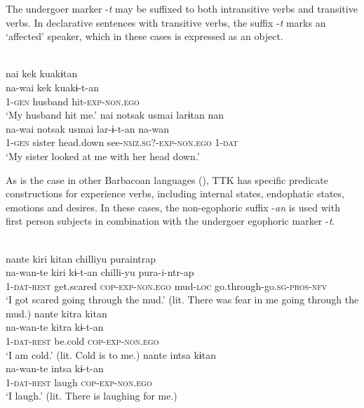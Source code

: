 \documentclass[output=paper]{langsci/langscibook}
\begin{document}
The undergoer marker -\textit{t} may be suffixed to both intransitive verbs and transitive verbs. In declarative sentences with transitive verbs, the suffix -\textit{t} marks an ‘affected’ speaker, which in these cases is expressed as an object.

\ea
{}\\ 
	\ea \label{ex:gg66a}
    \glll nai kek kuakɨtan\\
    na-wai	kek	kuakɨ-t-an\\
         1-\textsc{gen}	husband	hit-\textsc{exp-non.ego}\\
    \glt ‘‎‎My husband hit me.’
  \ex \label{ex:gg66b}
    \glll nai notsak usmai larɨtan nan\\
    na-wai	notsak	usmai	lar-ɨ-t-an	na-wan\\
         1-\textsc{gen}	sister	head.down	see-\textsc{nmz.sg?-exp-non.ego}	1-\textsc{dat}\\    
   	\glt ‘My sister looked at me with her head down.’
\z \z

As is the case in other Barbacoan languages (\citealt[25]{Floyd2018}), TTK has specific predicate constructions for experience verbs, including internal states, endophatic states, emotions and desires. In these cases, the non-egophoric suffix -\textit{an} is used with first person subjects in combination with the undergoer egophoric marker -\textit{t}.

\newpage
\ea
{}\\ 
	\ea \label{ex:gg67a}
    \glll nante	kiri kitan chilliyu	puraintrap\\
    na-wan-te kiri kɨ-t-an chilli-yu pura-i-ntr-ap\\
         1-\textsc{dat-rest} get.scared \textsc{cop-exp-non.ego} mud-\textsc{loc} go.through-go.\textsc{sg-pros-nfv}\\
    \glt ‘I got scared going through the mud.’ (lit. There was fear in me going through the mud.)
  	\ex \label{ex:gg67b}
    \glll nante kitra kitan\\
    na-wan-te kitra kɨ-t-an\\
        1-\textsc{dat-rest}	be.cold	\textsc{cop-exp-non.ego}\\    
   	\glt ‘I am cold.’ (lit. Cold is to me.)
  	\ex \label{ex:gg67c}
  	\glll nante	intsa kɨtan\\
  	na-wan-te intsa kɨ-t-an\\
  	1-\textsc{dat-rest} laugh \textsc{cop-exp-non.ego}\\
	\glt `I laugh.' (lit. There is laughing for me.) 
\z \z
\end{document}
